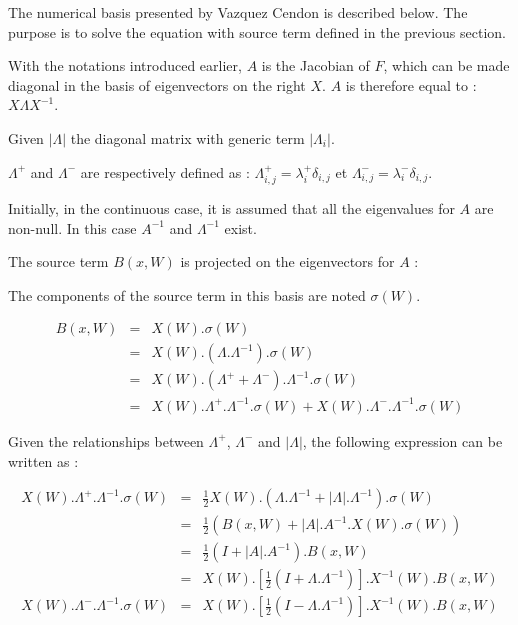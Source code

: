 The numerical basis presented by Vazquez Cendon is described below. The purpose is to solve the equation with source term defined in the previous section.

With the notations introduced earlier, $A$ is the Jacobian of $F$, which can be made diagonal in the basis of eigenvectors on the right $X$. $A$ is therefore equal to : $X \Lambda X^{-1}$.

Given $|\Lambda|$ the diagonal matrix with generic term $|\Lambda_i|$.

$\Lambda^+$ and $\Lambda^-$ are respectively defined as : $\Lambda_{i,j}^+ = \lambda_{i}^+ \delta_{i,j}$ et $\Lambda_{i,j}^- = \lambda_{i}^- \delta_{i,j}$.

Initially, in the continuous case, it is assumed that all the eigenvalues for $A$ are non-null. In this case $A^{-1}$ and $\Lambda^{-1}$ exist.

The source term $B(x,W)$ is projected on the eigenvectors for $A$ :

The components of the source term in this basis are noted $\sigma(W)$.

\begin{eqnarray}
 B(x,W) & = & X(W).\sigma(W) \nonumber \\
        & = & X(W).\left ( \Lambda . \Lambda^{-1} \right ).\sigma(W) \nonumber \\
        & = & X(W).\left ( \Lambda^+  + \Lambda^- \right ). \Lambda^{-1} .\sigma(W) \nonumber \\
        & = & X(W).\Lambda^+.\Lambda^{-1}.\sigma(W) + X(W).\Lambda^-.\Lambda^{-1}.\sigma(W)
\end{eqnarray}

Given the relationships between $\Lambda^+$, $\Lambda^-$ and $|\Lambda|$, the following expression can be written as :

\begin{eqnarray}
 X(W).\Lambda^+.\Lambda^{-1}.\sigma(W) & = & \frac{1}{2} X(W).\left ( \Lambda.\Lambda^{-1}+|\Lambda|.\Lambda^{-1}\right ) . \sigma(W) \nonumber \\
                                       & = & \frac{1}{2} \left ( B(x,W) + |A|.A^{-1}.X(W).\sigma(W) \right ) \nonumber \\
                                       & = & \frac{1}{2} \left ( I + |A|.A^{-1} \right ).B(x,W) \nonumber \\
                                       & = & X(W) . \left [ \frac{1}{2} \left ( I + \Lambda . \Lambda^{-1} \right ) \right ] . X^{-1}(W).B(x,W) \nonumber \\
 X(W).\Lambda^-.\Lambda^{-1}.\sigma(W) & = & X(W) . \left [ \frac{1}{2} \left ( I - \Lambda . \Lambda^{-1} \right ) \right ] . X^{-1}(W).B(x,W) \nonumber \\
\end{eqnarray}

